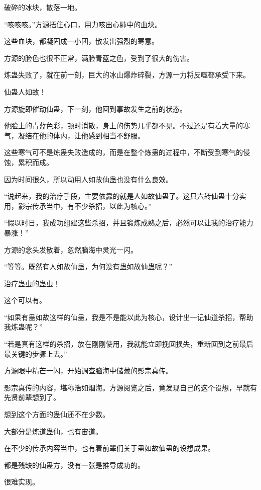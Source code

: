 
\begin{this_body}

破碎的冰块，散落一地。

“咳咳咳。”方源捂住心口，用力咳出心肺中的血块。

这些血块，都凝固成一小团，散发出强烈的寒意。

方源的脸色也很不正常，满脸青蓝之色，受到了很大的伤害。

炼蛊失败了，就在前一刻，巨大的冰山爆炸碎裂，方源一力将反噬都承受下来。

仙蛊人如故！

方源旋即催动仙蛊，下一刻，他回到事故发生之前的状态。

他脸上的青蓝色彩，顿时消散，身上的伤势几乎都不见。不过还是有着大量的寒气，凝结在他的体内，让他感到相当不舒服。

这些寒气可不是炼蛊失败造成的，而是在整个炼蛊的过程中，不断受到寒气的侵蚀，累积而成。

因为时间很久，所以动用人如故仙蛊也没有什么良效。

“说起来，我的治疗手段，主要依靠的就是人如故仙蛊了。这只六转仙蛊十分实用，影宗传承当中，有不少杀招，以此为核心。”

“假以时日，我成功组建这些杀招，并且锻炼成熟之后，必然可以让我的治疗能力暴涨！”

方源的念头发散着，忽然脑海中灵光一闪。

“等等。既然有人如故仙蛊，为何没有蛊如故仙蛊呢？”

治疗蛊虫的蛊虫！

这个可以有。

“如果有蛊如故这样的仙蛊，我是不是能以此为核心，设计出一记仙道杀招，帮助我炼蛊呢？”

“若是真有这样的杀招，放在刚刚使用，我就能立即挽回损失，重新回到之前最后最关键的步骤上去。”

方源眼中精芒一闪，开始调查脑海中储藏的影宗真传。

影宗真传的内容，堪称浩如烟海。方源阅览之后，竟发现自己的这个设想，早就有先贤前辈想到了。

想到这个方面的蛊仙还不在少数。

大部分是炼道蛊仙，也有宙道。

在不少的传承内容当中，也有着前辈们关于蛊如故仙蛊的设想成果。

都是残缺的仙蛊方，没有一张是推导成功的。

很难实现。


\end{this_body}
